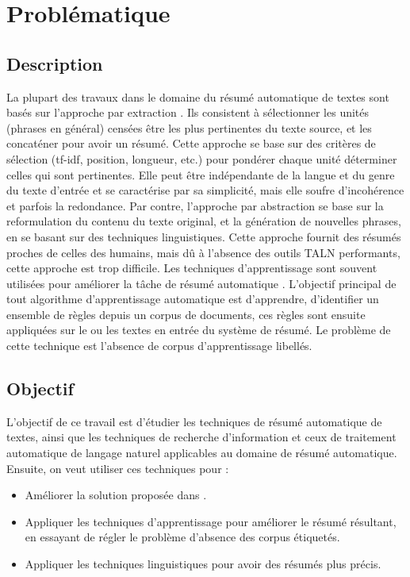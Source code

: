 \documentclass[12pt, oneside, a4paper]{book}
\begin{document}
\section{Problématique}

\subsection{Description}

La plupart des travaux dans le domaine du résumé automatique de textes sont basés sur l’approche par extraction \cite{58-luhn,69-edmundson}. 
Ils consistent à sélectionner les unités (phrases en général) censées être les plus pertinentes du texte source, et les concaténer pour avoir un résumé. 
Cette approche se base sur des critères de sélection (tf-idf, position, longueur, etc.) pour pondérer chaque unité déterminer celles qui sont pertinentes. 
Elle peut être indépendante de la langue et du genre du texte d’entrée et se caractérise par sa simplicité, mais elle soufre d’incohérence et parfois la redondance.
Par contre, l’approche par abstraction se base sur la reformulation du contenu du texte original, et la génération de nouvelles phrases, en se basant sur des techniques linguistiques. 
Cette approche fournit des résumés proches de celles des humains, mais dû à l’absence des outils TALN performants, cette approche est trop difficile.
Les techniques d’apprentissage sont souvent utilisées pour améliorer la tâche de résumé automatique \cite{05-yeh-al, 08-wong-al,10-yatsko-al}. 
L'objectif principal de tout algorithme d'apprentissage automatique est d'apprendre, d'identifier un ensemble de règles depuis un corpus de documents, ces règles sont ensuite appliquées sur le ou les textes en entrée du système de résumé. 
Le problème de cette technique est l’absence de corpus d’apprentissage libellés.

\subsection{Objectif}

L’objectif de ce travail est d’étudier les techniques de résumé automatique de textes, ainsi que les techniques de recherche d’information et ceux de traitement automatique de langage naturel applicables au domaine de résumé automatique. 
Ensuite, on veut utiliser ces techniques pour :
\begin{itemize}
\item Améliorer la solution proposée dans \cite{13-aries-al}.
\item Appliquer les techniques d’apprentissage pour améliorer le résumé résultant, en essayant de régler le problème d’absence des corpus étiquetés.
\item Appliquer les techniques linguistiques pour avoir des résumés plus précis.
\end{itemize}
\end{document}
